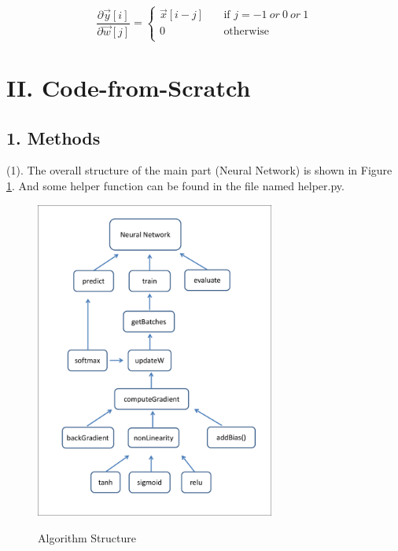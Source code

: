 \begin{description}
\begin{equation}
	\frac{\partial \vec{y}[i]}{\partial \vec{w}[j]} =
	\begin{cases}
			\vec{x}[i-j]	& 	\quad \text{if } j = -1 \  or \  0 \  or \  1 \\
			0				& 	\quad \text{otherwise} \\
		\end{cases}
\end{equation}
\end{description}

\newpage
\section*{\Large II. Code-from-Scratch}

\subsection*{\large 1. Methods}

(1). The overall structure of the main part (Neural Network) is shown in Figure \ref{fig:structure}. And some helper function can be found in the file named helper.py.

\begin{figure}[H]
\centering
\includegraphics[width=0.7\textwidth]{./figures/ECE544hw2.pdf}\
\caption{\label{fig:structure} Algorithm Structure}
\end{figure}

